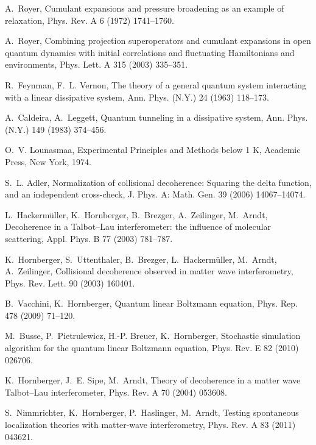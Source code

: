 \documentclass[3p,sort&compress]{elsarticle}
\begin{document}
\begin{thebibliography}{100}
A.~Royer, Cumulant expansions and pressure broadening as an example of
  relaxation, Phys. Rev. A 6 (1972) 1741--1760.

A.~Royer, Combining projection superoperators and cumulant expansions in open
  quantum dynamics with initial correlations and fluctuating {H}amiltonians and
  environments, Phys. Lett. A 315 (2003) 335--351.

R.~Feynman, F.~L. Vernon, The theory of a general quantum system interacting
  with a linear dissipative system, Ann. Phys. (N.Y.) 24 (1963) 118--173.

A.~Caldeira, A.~Leggett, Quantum tunneling in a dissipative system, Ann. Phys.
  (N.Y.) 149 (1983) 374--456.

O.~V. Lounasmaa, Experimental Principles and Methods below 1 K, Academic Press,
  New York, 1974.

S.~L. Adler, Normalization of collisional decoherence: Squaring the delta
  function, and an independent cross-check, J. Phys. A: Math. Gen. 39 (2006)
  14067--14074.

L.~Hackerm{\"u}ller, K.~Hornberger, B.~Brezger, A.~Zeilinger, M.~Arndt,
  Decoherence in a {T}albot--{L}au interferometer: the influence of molecular
  scattering, Appl. Phys. B 77 (2003) 781--787.

K.~Hornberger, S.~Uttenthaler, B.~Brezger, L.~Hackerm{\"u}ller, M.~Arndt,
  A.~Zeilinger, Collisional decoherence observed in matter wave interferometry,
  Phys. Rev. Lett. 90 (2003) 160401.

B.~Vacchini, K.~Hornberger, Quantum linear {B}oltzmann equation, Phys. Rep. 478
  (2009) 71--120.

M.~Busse, P.~Pietrulewicz, H.-P. Breuer, K.~Hornberger, Stochastic simulation
  algorithm for the quantum linear {B}oltzmann equation, Phys. Rev. E 82 (2010)
  026706.

K.~Hornberger, J.~E. Sipe, M.~Arndt, Theory of decoherence in a matter wave
  {T}albot--{L}au interferometer, Phys. Rev. A 70 (2004) 053608.

S.~Nimmrichter, K.~Hornberger, P.~Haslinger, M.~Arndt, Testing spontaneous
  localization theories with matter-wave interferometry, Phys. Rev. A 83 (2011)
  043621.


\end{thebibliography}
\end{document}
